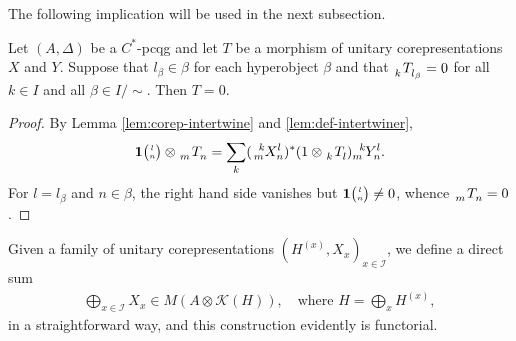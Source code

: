 The following implication will be used in the next subsection.
\begin{Prop} \label{prop:restrict-morphisms}
  Let $(A,\Delta)$ be a $C^{*}$-pcqg and let $T$ be a morphism of unitary corepresentations $X$ and $Y$. Suppose that $l_{\beta} \in \beta$ for each hyperobject $\beta$ and that $\Grd{T}{k}{l_{\beta}}=0$ for all $k\in I$ and all $\beta\in I/\sim$. Then $T=0$.
\end{Prop} 
\begin{proof}
  By Lemma \ref{lem:corep-intertwine} and \ref{lem:def-intertwiner}, 
  \begin{align*}
    \UnitC{l}{n} \otimes \Grd{T}{m}{n} = \sum_{k}
    (\Gr{X}{k}{l}{m}{n})^{*}(1\otimes \Grd{T}{k}{l})\Gr{Y}{k}{l}{m}{n}.
  \end{align*}
For $l=l_{\beta}$   and $n\in \beta$, the right hand side vanishes but $\mathbf{1}{\tiny {\begin{pmatrix} l\\n\end{pmatrix}}}\neq 0$, whence $\Grd{T}{m}{n}=0$.
\end{proof}

Given a family of unitary corepresentations $(H^{(x)},X_{x})_{x \in \mathcal{I}}$, we define a direct sum
\begin{align*}
  \bigoplus_{x\in \mathcal{I}} X_{x} \in M(A \otimes \mathcal{K}(H)), \quad \text{where } H = \bigoplus_{x} H^{(x)},
\end{align*}
in a straightforward way, and this construction evidently is functorial. 

